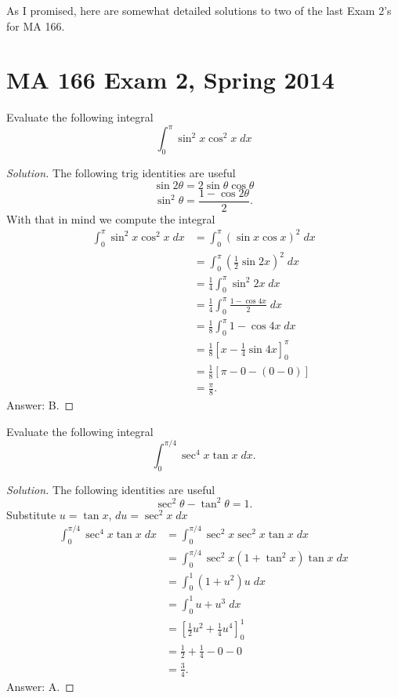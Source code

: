 As I promised, here are somewhat detailed solutions to two of the last Exam
2's for MA 166.
\chapter{MA 166 Exam 2, Spring 2014}
\begin{problem}
Evaluate the following integral
\[
\int_0^\pi \sin^2x \cos^2 x\;dx
\]
\end{problem}
\begin{proof}[Solution]
The following trig identities are useful
\begin{equation}
  \label{eq:sine-double-angle-formula}
\sin 2\theta=2\sin\theta\cos\theta
\end{equation}
\begin{equation}
\label{eq:sine-square-formula}
\sin^2\theta=\frac{1-\cos 2\theta}{2}.
\end{equation}
With that in mind we compute the integral
\begin{align*}
\int_0^\pi \sin^2x \cos^2 x\;dx
&=\int_0^\pi\left(\sin x\cos x\right)^2\;dx\\
&=\int_0^\pi\left(\frac{1}{2}\sin 2x\right)^2\;dx\\
&=\frac{1}{4}\int_0^\pi\sin^2 2x\;dx\\
&=\frac{1}{4}\int_0^\pi\frac{1-\cos 4x}{2}\;dx\\
&=\frac{1}{8}\int_0^\pi 1-\cos 4x\;dx\\
&=\frac{1}{8}\left[x-\frac{1}{4}\sin 4x\right]_0^\pi\\
&=\frac{1}{8}\left[\pi-0-(0-0)\right]\\
&=\boxed{\frac{\pi}{8}.}
\end{align*}
Answer: B.
\end{proof}
\begin{problem}
Evaluate the following integral
\[
\int_0^{\pi/4}\sec^4 x\tan x\;dx.
\]
\end{problem}
\begin{proof}[Solution]
The following identities are useful
\begin{equation}
  \label{eq:tangent-pythagorean-identity}
\sec^2\theta-\tan^2\theta=1.
\end{equation}
Substitute $u=\tan x$, $du=\sec^2 x\;dx$
\begin{align*}
\int_0^{\pi/4}\sec^4 x\tan x\;dx
&=\int_0^{\pi/4}\sec^2 x\sec^2 x\tan x\;dx\\
&=\int_0^{\pi/4}\sec^2 x(1+\tan^2 x)\tan x\;dx\\
&=\int_0^1(1+u^2)u\;dx\\
&=\int_0^1u+u^3\;dx\\
&=\left[\frac{1}{2}u^2+\frac{1}{4}u^4\right]_0^1\\
&=\frac{1}{2}+\frac{1}{4}-0-0\\
&=\boxed{\frac{3}{4}.}
\end{align*}
Answer: A.
\end{proof}
